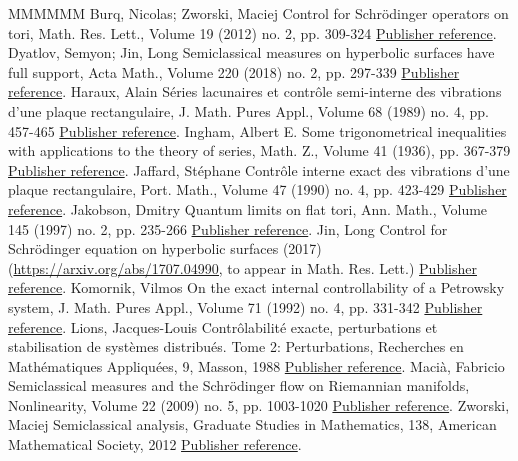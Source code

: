 \documentclass[11pt]{article}
\theoremstyle{definition}
\numberwithin{equation}{section}
\numberwithin{figure}{section}
\numberwithin{table}{section}
\begin{document}
\begin{thebibliography}{MMMMMM}
 Burq, Nicolas; Zworski, Maciej Control for Schrödinger operators on tori, Math. Res. Lett., Volume 19 (2012) no. 2, pp. 309-324 \href{https://ahl.centre-mersenne.org/item/AHL_2019__2__331_0/#BZ4}{Publisher reference}.
 Dyatlov, Semyon; Jin, Long Semiclassical measures on hyperbolic surfaces have full support, Acta Math., Volume 220 (2018) no. 2, pp. 297-339 \href{https://ahl.centre-mersenne.org/item/AHL_2019__2__331_0/#DJ}{Publisher reference}.
 Haraux, Alain Séries lacunaires et contrôle semi-interne des vibrations d’une plaque rectangulaire, J. Math. Pures Appl., Volume 68 (1989) no. 4, pp. 457-465 \href{https://ahl.centre-mersenne.org/item/AHL_2019__2__331_0/#Ha}{Publisher reference}.
 Ingham, Albert E. Some trigonometrical inequalities with applications to the theory of series, Math. Z., Volume 41 (1936), pp. 367-379 \href{https://ahl.centre-mersenne.org/item/AHL_2019__2__331_0/#ing}{Publisher reference}.
 Jaffard, Stéphane Contrôle interne exact des vibrations d’une plaque rectangulaire, Port. Math., Volume 47 (1990) no. 4, pp. 423-429 \href{https://ahl.centre-mersenne.org/item/AHL_2019__2__331_0/#Ja}{Publisher reference}.
 Jakobson, Dmitry Quantum limits on flat tori, Ann. Math., Volume 145 (1997) no. 2, pp. 235-266 \href{https://ahl.centre-mersenne.org/item/AHL_2019__2__331_0/#Jak}{Publisher reference}.
 Jin, Long Control for Schrödinger equation on hyperbolic surfaces (2017) (\url{https://arxiv.org/abs/1707.04990,} to appear in Math. Res. Lett.) \href{https://ahl.centre-mersenne.org/item/AHL_2019__2__331_0/#Ji}{Publisher reference}.
 Komornik, Vilmos On the exact internal controllability of a Petrowsky system, J. Math. Pures Appl., Volume 71 (1992) no. 4, pp. 331-342 \href{https://ahl.centre-mersenne.org/item/AHL_2019__2__331_0/#Ko}{Publisher reference}.
 Lions, Jacques-Louis Contrôlabilité exacte, perturbations et stabilisation de systèmes distribués. Tome 2: Perturbations, Recherches en Mathématiques Appliquées, 9, Masson, 1988 \href{https://ahl.centre-mersenne.org/item/AHL_2019__2__331_0/#Li}{Publisher reference}.
 Macià, Fabricio Semiclassical measures and the Schrödinger flow on Riemannian manifolds, Nonlinearity, Volume 22 (2009) no. 5, pp. 1003-1020 \href{https://ahl.centre-mersenne.org/item/AHL_2019__2__331_0/#Ma}{Publisher reference}.
 Zworski, Maciej Semiclassical analysis, Graduate Studies in Mathematics, 138, American Mathematical Society, 2012 \href{https://ahl.centre-mersenne.org/item/AHL_2019__2__331_0/#EZB}{Publisher reference}.
\end{thebibliography}
\end{document}
